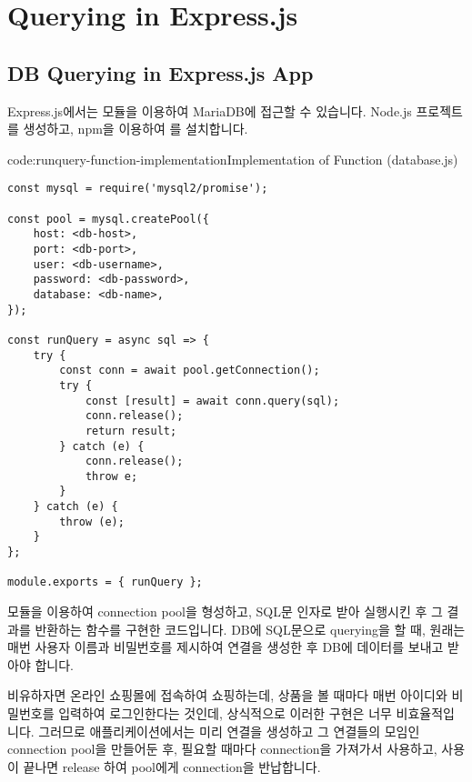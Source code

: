 \section{Querying in Express.js}\label{sect:querying-in-express-js}

\subsection*{DB Querying in Express.js App}

Express.js에서는  모듈을 이용하여 MariaDB에 접근할 수 있습니다. Node.js 프로젝트를 생성하고, npm을 이용하여 를 설치합니다.

\begin{codeenv}{code:runquery-function-implementation}{Implementation of  Function (database.js)}\begin{verbatim}
const mysql = require('mysql2/promise');

const pool = mysql.createPool({
    host: <db-host>,
    port: <db-port>,
    user: <db-username>,
    password: <db-password>,
    database: <db-name>,
});

const runQuery = async sql => {
    try {
        const conn = await pool.getConnection();
        try {
            const [result] = await conn.query(sql);
            conn.release();
            return result;
        } catch (e) {
            conn.release();
            throw e;
        }
    } catch (e) {
        throw (e);
    }
};

module.exports = { runQuery };
\end{verbatim}
\end{codeenv}

\은  모듈을 이용하여 connection pool을 형성하고, SQL문 인자로 받아 실행시킨 후 그 결과를 반환하는  함수를 구현한 코드입니다. DB에 SQL문으로 querying을 할 때, 원래는 매번 사용자 이름과 비밀번호를 제시하여 연결을 생성한 후 DB에 데이터를 보내고 받아야 합니다.

비유하자면 온라인 쇼핑몰에 접속하여 쇼핑하는데, 상품을 볼 때마다 매번 아이디와 비밀번호를 입력하여 로그인한다는 것인데, 상식적으로 이러한 구현은 너무 비효율적입니다. 그러므로 애플리케이션에서는 미리 연결을 생성하고 그 연결들의 모임인 connection pool을 만들어둔 후, 필요할 때마다 connection을 가져가서 사용하고, 사용이 끝나면 release 하여 pool에게 connection을 반납합니다.

